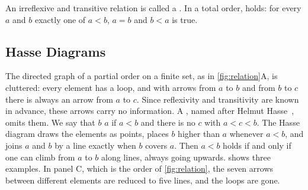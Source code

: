 An irreflexive and transitive relation is called a . In a total order,  holds: for every $a$ and $b$ exactly one of $a<b$, $a=b$ and $b<a$ is true.

\subsection{Hasse Diagrams}

The directed graph of a partial order on a finite set, as in \cref{fig:relation}A, is cluttered: every element has a loop, and with arrows from $a$ to $b$ and from $b$ to $c$ there is always an arrow from $a$ to $c$. Since reflexivity and transitivity are known in advance, these arrows carry no information. A , named after Helmut Hasse~\cite{daveypriestley2002}, omits them. We say that $b$  $a$ if $a<b$ and there is no $c$ with $a<c<b$. The Hasse diagram draws the elements as points, places $b$ higher than $a$ whenever $a<b$, and joins $a$ and $b$ by a line exactly when $b$ covers $a$. Then $a<b$ holds if and only if one can climb from $a$ to $b$ along lines, always going upwards.  shows three examples. In panel C, which is the order of \cref{fig:relation}, the seven arrows between different elements are reduced to five lines, and the loops are gone.

